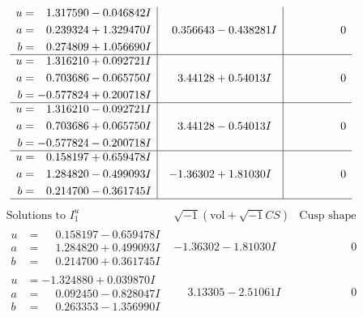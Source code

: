 \documentclass[1p]{elsarticle_modified}
\theoremstyle{definition}
\newcommand{\I}{\sqrt{-1}}
\begin{document}
$$\begin{array}{c|c|c}
\begin{aligned}
u &= \phantom{-}1.317590 - 0.046842 I \\
a &= \phantom{-}0.239324 + 1.329470 I \\
b &= \phantom{-}0.274809 + 1.056690 I\end{aligned}
 & \phantom{-}0.356643 - 0.438281 I & \phantom{-0.000000 } 0 \\ \hline\begin{aligned}
u &= \phantom{-}1.316210 + 0.092721 I \\
a &= \phantom{-}0.703686 - 0.065750 I \\
b &= -0.577824 + 0.200718 I\end{aligned}
 & \phantom{-}3.44128 + 0.54013 I & \phantom{-0.000000 } 0 \\ \hline\begin{aligned}
u &= \phantom{-}1.316210 - 0.092721 I \\
a &= \phantom{-}0.703686 + 0.065750 I \\
b &= -0.577824 - 0.200718 I\end{aligned}
 & \phantom{-}3.44128 - 0.54013 I & \phantom{-0.000000 } 0 \\ \hline\begin{aligned}
u &= \phantom{-}0.158197 + 0.659478 I \\
a &= \phantom{-}1.284820 - 0.499093 I \\
b &= \phantom{-}0.214700 - 0.361745 I\end{aligned}
 & -1.36302 + 1.81030 I & \phantom{-0.000000 } 0\\
 \hline 
 \end{array}$$\newpage$$\begin{array}{c|c|c}  
\text{Solutions to }I^u_{1}& \I (\text{vol} + \sqrt{-1}CS) & \text{Cusp shape}\\
 \hline 
\begin{aligned}
u &= \phantom{-}0.158197 - 0.659478 I \\
a &= \phantom{-}1.284820 + 0.499093 I \\
b &= \phantom{-}0.214700 + 0.361745 I\end{aligned}
 & -1.36302 - 1.81030 I & \phantom{-0.000000 } 0 \\ \hline\begin{aligned}
u &= -1.324880 + 0.039870 I \\
a &= \phantom{-}0.092450 - 0.828047 I \\
b &= \phantom{-}0.263353 - 1.356990 I\end{aligned}
 & \phantom{-}3.13305 - 2.51061 I & \phantom{-0.000000 } 0 \\ \hline\begin{aligned}

\end{aligned}
\end{array}$$
\end{document}
